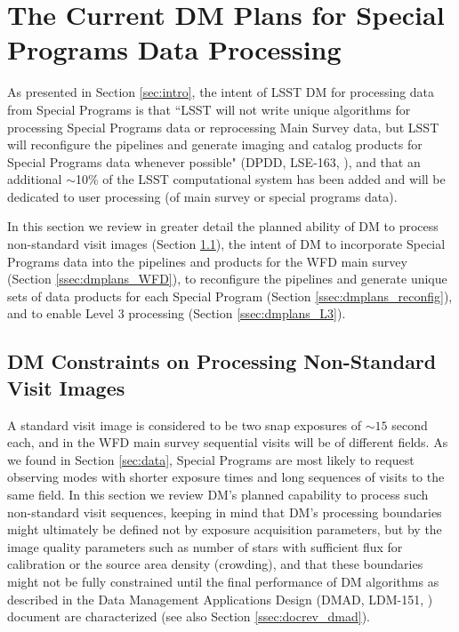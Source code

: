 \documentclass[DM,lsstdraft,toc]{lsstdoc}
\begin{document}
\clearpage
\section{The Current DM Plans for Special Programs Data Processing} \label{sec:dmplans}

As presented in Section \ref{sec:intro}, the intent of LSST DM for processing data from Special Programs is that ``LSST will not write unique algorithms for processing Special Programs data or reprocessing Main Survey data, but LSST will reconfigure the pipelines and generate imaging and catalog products for Special Programs data whenever possible" (DPDD, LSE-163, \cite{LSE-163}), and that an additional $\sim$10\% of the LSST computational system has been added and will be dedicated to user processing (of main survey or special programs data).

In this section we review in greater detail the planned ability of DM to process non-standard visit images (Section \ref{ssec:dmplans_NSV}), the intent of DM to incorporate Special Programs data into the pipelines and products for the WFD main survey (Section \ref{ssec:dmplans_WFD}), to reconfigure the pipelines and generate unique sets of data products for each Special Program (Section \ref{ssec:dmplans_reconfig}), and to enable Level 3 processing (Section \ref{ssec:dmplans_L3}). 

\subsection{DM Constraints on Processing Non-Standard Visit Images}\label{ssec:dmplans_NSV}

A standard visit image is considered to be two snap exposures of $\sim15$ second each, and in the WFD main survey sequential visits will be of different fields. As we found in Section \ref{sec:data}, Special Programs are most likely to request observing modes with shorter exposure times and long sequences of visits to the same field. In this section we review DM's planned capability to process such non-standard visit sequences, keeping in mind that DM's processing boundaries might ultimately be defined not by exposure acquisition parameters, but by the image quality parameters such as number of stars with sufficient flux for calibration or the source area density (crowding), and that these boundaries might not be fully constrained until the final performance of DM algorithms as described in the Data Management Applications Design (DMAD, LDM-151, \cite{LDM-151}) document are characterized (see also Section \ref{ssec:docrev_dmad}).
\end{document}
